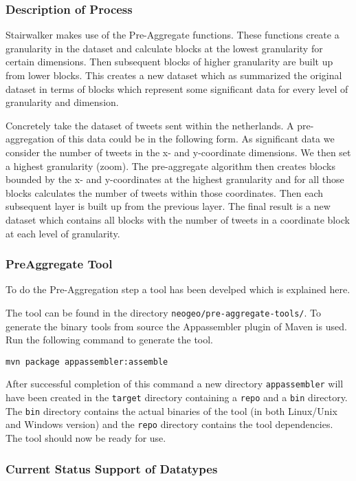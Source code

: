 \subsubsection{Description of Process}
Stairwalker makes use of the Pre-Aggregate functions. These functions create a granularity in the dataset and calculate blocks at the lowest granularity for certain dimensions. Then subsequent blocks of higher granularity are built up from lower blocks. This creates a new dataset which as summarized the original dataset in terms of blocks which represent some significant data for every level of granularity and dimension.

\noindent Concretely take the dataset of tweets sent within the netherlands. A pre-aggregation of this data could be in the following form. As significant data we consider the number of tweets in the x- and y-coordinate dimensions. We then set a highest granularity (zoom). The pre-aggregate algorithm then creates blocks bounded by the x- and y-coordinates at the highest granularity and for all those blocks calculates the number of tweets within those coordinates. Then each subsequent layer is built up from the previous layer. The final result is a new dataset which contains all blocks with the number of tweets in a coordinate block at each level of granularity.

\subsubsection{PreAggregate Tool}
To do the Pre-Aggregation step a tool has been develped which is explained here.

\noindent The tool can be found in the directory \lstinline$neogeo/pre-aggregate-tools/$. To generate the binary tools from source the Appassembler plugin of Maven is used. Run the following command to generate the tool.
\begin{lstlisting}
mvn package appassembler:assemble
\end{lstlisting}
After successful completion of this command a new directory \lstinline$appassembler$ will have been created in the \lstinline$target$ directory containing a \lstinline$repo$ and a \lstinline$bin$ directory. The \lstinline$bin$ directory contains the actual binaries of the tool (in both Linux/Unix and Windows version) and the \lstinline$repo$ directory contains the tool dependencies. The tool should now be ready for use.
\subsubsection{Current Status Support of Datatypes}

